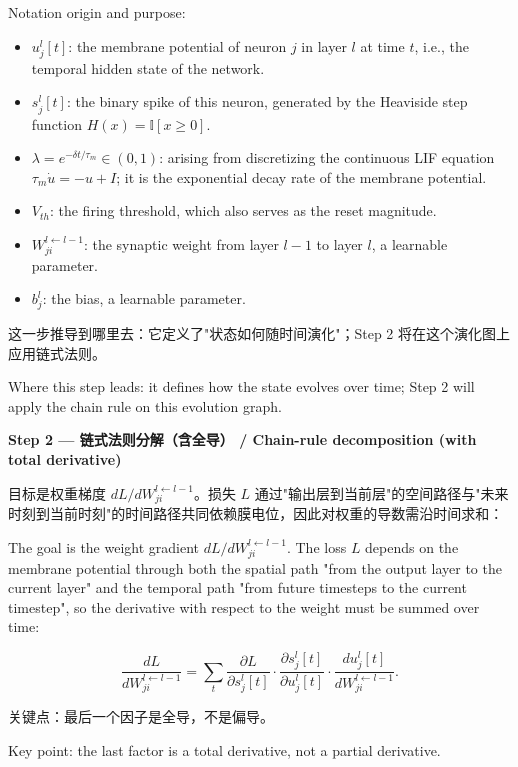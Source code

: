 \documentclass[journal,12pt,onecolumn]{IEEEtran}
\begin{document}
Notation origin and purpose:
\begin{itemize}[leftmargin=1.5em,itemsep=2pt]
\item $u_j^l[t]$: the membrane potential of neuron $j$ in layer $l$ at time $t$, i.e., the temporal hidden state of the network.
\item $s_j^l[t]$: the binary spike of this neuron, generated by the Heaviside step function $H(x)=\mathbb I[x\ge 0]$.
\item $\lambda=e^{-\delta t/\tau_m}\in(0,1)$: arising from discretizing the continuous LIF equation $\tau_m\dot u=-u+I$; it is the exponential decay rate of the membrane potential.
\item $V_{th}$: the firing threshold, which also serves as the reset magnitude.
\item $W_{ji}^{l\leftarrow l-1}$: the synaptic weight from layer $l-1$ to layer $l$, a learnable parameter.
\item $b_j^l$: the bias, a learnable parameter.
\end{itemize}

这一步推导到哪里去：它定义了"状态如何随时间演化"；Step 2 将在这个演化图上应用链式法则。

Where this step leads: it defines how the state evolves over time; Step 2 will apply the chain rule on this evolution graph.

\medskip\noindent\textbf{Step 2 — 链式法则分解（含全导） / Chain-rule decomposition (with total derivative)}

目标是权重梯度 $dL/dW_{ji}^{l\leftarrow l-1}$。损失 $L$ 通过"输出层到当前层"的空间路径与"未来时刻到当前时刻"的时间路径共同依赖膜电位，因此对权重的导数需沿时间求和：

The goal is the weight gradient $dL/dW_{ji}^{l\leftarrow l-1}$. The loss $L$ depends on the membrane potential through both the spatial path "from the output layer to the current layer" and the temporal path "from future timesteps to the current timestep", so the derivative with respect to the weight must be summed over time:

\begin{equation}
\frac{dL}{dW_{ji}^{l\leftarrow l-1}} = \sum_t \frac{\partial L}{\partial s_j^l[t]} \cdot \frac{\partial s_j^l[t]}{\partial u_j^l[t]} \cdot \frac{d u_j^l[t]}{d W_{ji}^{l\leftarrow l-1}}.
\end{equation}

关键点：最后一个因子是全导，不是偏导。

Key point: the last factor is a total derivative, not a partial derivative.
\end{document}
